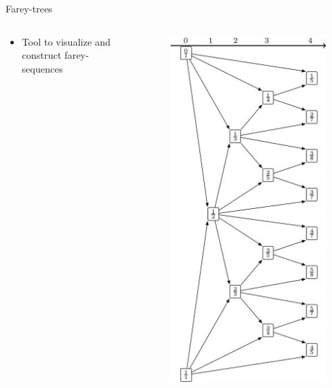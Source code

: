 \begin{frame}{Farey-trees}
	\begin{columns}
		\begin{column}{.5 \textwidth}
			\begin{itemize}
				\item Tool to visualize and construct farey-sequences
			\end{itemize}
		\end{column}
		\begin{column}{.25 \textwidth}
			\vspace{-5em}
			\begin{figure}
				\includegraphics[width=\textwidth]{../../Report/Figures/FareyTrees/LR_RotNum/adding.png}

\end{figure}
\end{column}
\end{columns}
\end{frame}
